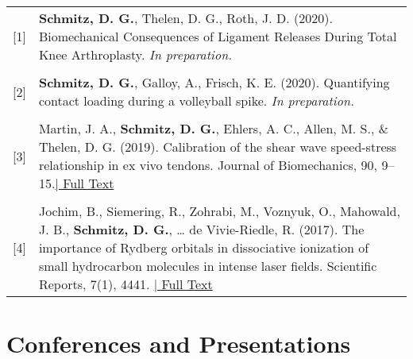 \documentclass[a4paper,10pt]{article} %
\begin{document}
\begin{tabular}{rp{13cm}}
{[1]} & \textbf{Schmitz, D. G.}, Thelen, D. G., Roth, J. D. (2020). Biomechanical Consequences of Ligament Releases During Total Knee Arthroplasty. \emph{In preparation.} \\
\\
{[2]} & \textbf{Schmitz, D. G.}, Galloy, A., Frisch, K. E. (2020). Quantifying contact loading during a volleyball spike. \emph{In preparation.} \\
\\
{[3]} & Martin, J. A., \textbf{Schmitz, D. G.}, Ehlers, A. C., Allen, M. S., \& Thelen, D. G. (2019). Calibration of the shear wave speed-stress relationship in ex vivo tendons. Journal of Biomechanics, 90, 9–15.\hyperlink{https://doi.org/10.1016/j.jbiomech.2019.04.015}{\hfill | \footnotesize Full Text} \\
\\
{[4]} & Jochim, B., Siemering, R., Zohrabi, M., Voznyuk, O., Mahowald, J. B., \textbf{Schmitz, D. G.}, {\ldots} de Vivie-Riedle, R. (2017). The importance of Rydberg orbitals in dissociative ionization of small hydrocarbon molecules in intense laser fields. Scientific Reports, 7(1), 4441.
\hyperlink{https://doi.org/10.1038/s41598-017-04638-0}{\hfill | \footnotesize Full Text} \\
\end{tabular}


\section{Conferences and Presentations}

\end{document}
